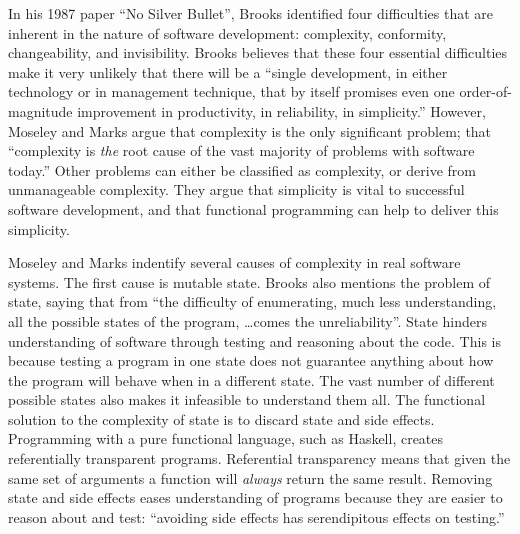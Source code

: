 In his 1987 paper ``No Silver Bullet'', Brooks identified four difficulties that
are inherent in the nature of software development: complexity, conformity,
changeability, and invisibility.\cite{brooks1987bullet} Brooks believes that
these four essential difficulties make it very unlikely that there will be a
``single development, in either technology or in management technique,
that by itself promises even one order-of-magnitude improvement in productivity,
in reliability, in simplicity.'' However, Moseley and Marks argue that complexity
is the only significant problem; that ``complexity is \emph{the} root cause of the
vast majority of problems with software today.''\cite{moseley2006tarpit} Other
problems can either be classified as complexity, or derive from unmanageable
complexity. They argue that simplicity is vital to successful software development,
and that functional programming can help to deliver this simplicity.

Moseley and Marks indentify several causes of complexity in real software systems.
The first cause is mutable state. Brooks also mentions the problem of state,
saying that from ``the difficulty of enumerating, much less understanding, all
the possible states of the program, \ldots comes the unreliability''.\cite{brooks1987bullet}
State hinders understanding of software through testing and reasoning about the code.
This is because testing a program in one state does not guarantee anything about
how the program will behave when in a different state. The vast number of different
possible states also makes it infeasible to understand them all. The functional
solution to the complexity of state is to discard state and side effects.
Programming with a pure functional language, such as Haskell, creates referentially
transparent programs. Referential transparency means that given the same set of
arguments a function will \emph{always} return the same result. Removing state
and side effects eases understanding of programs because they are easier to
reason about and test: ``avoiding side effects has serendipitous effects on testing.''\cite{smallbone2011}

